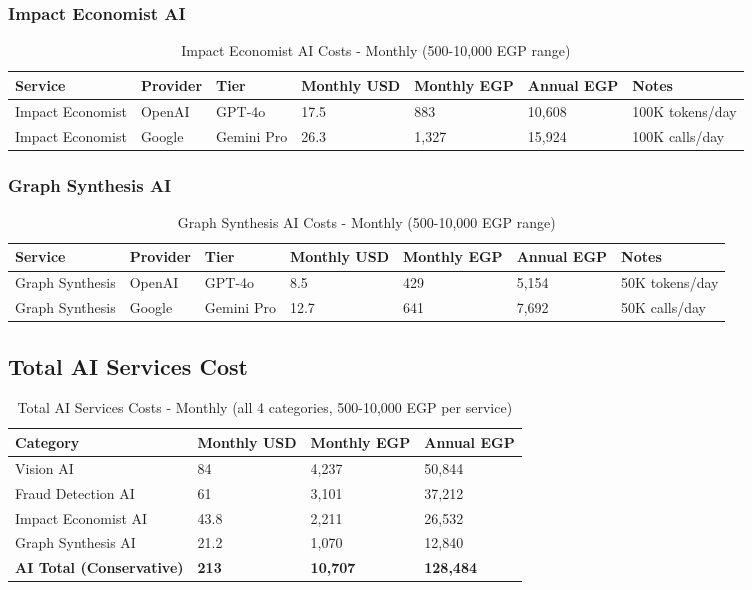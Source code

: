 \documentclass[11pt,a4paper]{article}
\begin{document}
\subsubsection{Impact Economist AI}

\begin{table}[H]
\centering
\footnotesize
\begin{tabular}{|l|l|l|l|l|l|l|}
\hline
\textbf{Service} & \textbf{Provider} & \textbf{Tier} & \textbf{Monthly USD} & \textbf{Monthly EGP} & \textbf{Annual EGP} & \textbf{Notes} \\
\hline
Impact Economist & OpenAI & GPT-4o & 17.5 & 883 & 10,608 & 100K tokens/day \\
Impact Economist & Google & Gemini Pro & 26.3 & 1,327 & 15,924 & 100K calls/day \\
\hline
\end{tabular}
\caption{Impact Economist AI Costs - Monthly (500-10,000 EGP range)}
\end{table}

\subsubsection{Graph Synthesis AI}

\begin{table}[H]
\centering
\footnotesize
\begin{tabular}{|l|l|l|l|l|l|l|}
\hline
\textbf{Service} & \textbf{Provider} & \textbf{Tier} & \textbf{Monthly USD} & \textbf{Monthly EGP} & \textbf{Annual EGP} & \textbf{Notes} \\
\hline
Graph Synthesis & OpenAI & GPT-4o & 8.5 & 429 & 5,154 & 50K tokens/day \\
Graph Synthesis & Google & Gemini Pro & 12.7 & 641 & 7,692 & 50K calls/day \\
\hline
\end{tabular}
\caption{Graph Synthesis AI Costs - Monthly (500-10,000 EGP range)}
\end{table}

\subsection{Total AI Services Cost}

\begin{table}[H]
\centering
\footnotesize
\begin{tabular}{|l|l|l|l|}
\hline
\textbf{Category} & \textbf{Monthly USD} & \textbf{Monthly EGP} & \textbf{Annual EGP} \\
\hline
Vision AI & 84 & 4,237 & 50,844 \\
Fraud Detection AI & 61 & 3,101 & 37,212 \\
Impact Economist AI & 43.8 & 2,211 & 26,532 \\
Graph Synthesis AI & 21.2 & 1,070 & 12,840 \\
\hline
\textbf{AI Total (Conservative)} & \textbf{213} & \textbf{10,707} & \textbf{128,484} \\
\hline
\end{tabular}
\caption{Total AI Services Costs - Monthly (all 4 categories, 500-10,000 EGP per service)}
\end{table}
\end{document}
